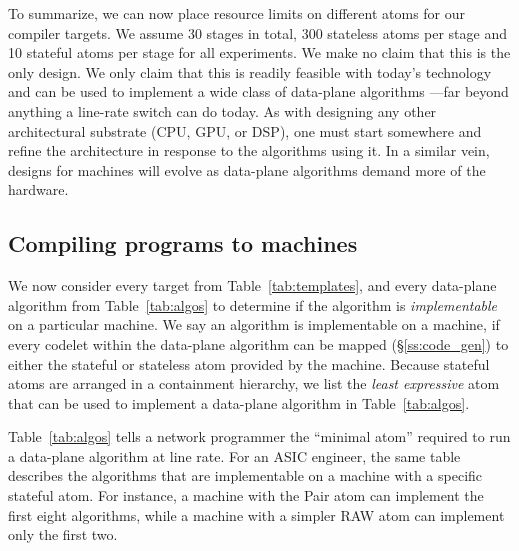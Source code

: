 To summarize, we can now place resource limits on different atoms for our
compiler targets. We assume 30 stages in total, 300 stateless atoms per stage
and 10 stateful atoms per stage for all experiments. We make no claim that this
is the only design. We only claim that this is readily feasible with today's
technology and can be used to implement a wide class of data-plane algorithms
---far beyond anything a line-rate switch can do today. As with designing any
other architectural substrate (CPU, GPU, or DSP), one must start somewhere and
refine the architecture in response to the algorithms using it. In a similar
vein, designs for \absmachine machines will evolve as data-plane algorithms
demand more of the hardware.


\subsection{Compiling \pktlanguage programs to \absmachine machines}

We now consider every target from Table~\ref{tab:templates}, and every
data-plane algorithm from Table~\ref{tab:algos} to determine if the algorithm
is \textit{implementable} on a particular \absmachine machine. We say an
algorithm is implementable on a \absmachine machine, if every codelet within
the data-plane algorithm can be mapped (\S\ref{ss:code_gen}) to either the
stateful or stateless atom provided by the \absmachine machine. Because
stateful atoms are arranged in a containment hierarchy, we list the
\textit{least expressive} atom that can be used to implement a data-plane
algorithm in Table~\ref{tab:algos}.

Table~\ref{tab:algos} tells a network programmer the ``minimal atom'' required
to run a data-plane algorithm at line rate. For an ASIC engineer, the same
table describes the algorithms that are implementable on a \absmachine machine
with a specific stateful atom. For instance, a \absmachine machine with the
Pair atom can implement the first eight algorithms, while a machine with a
simpler RAW atom can implement only the first two.

